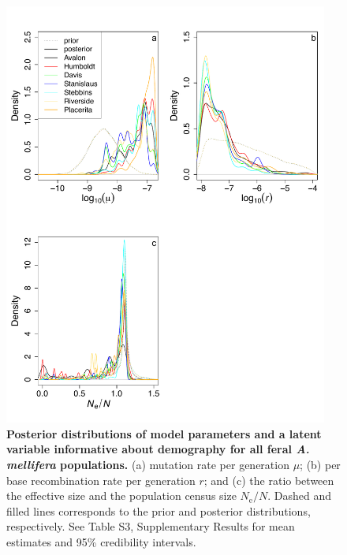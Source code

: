 \documentclass[a4paper, 12pt]{article}
\begin{document}
\begin{figure}[ht]
  \centering
  \includegraphics[width=0.95\textwidth]{Figures/FigureS27_weighted_densityPlots_demography_feralbees.pdf}
  \small\caption{\textbf{Posterior distributions of model parameters and a latent variable informative about demography for all feral \textit{A. mellifera} populations.} (a) mutation rate per generation $\mu$; (b) per base recombination rate per generation $r$; and (c) the ratio between the effective size and the population census size $N_{\mathrm{e}}/N$. Dashed and filled lines corresponds to the prior and posterior distributions, respectively. See Table S3, Supplementary Results for mean estimates and 95\% credibility intervals.}
  \label{fig:supple_feralbee_densitydemo}
\end{figure}
\end{document}
